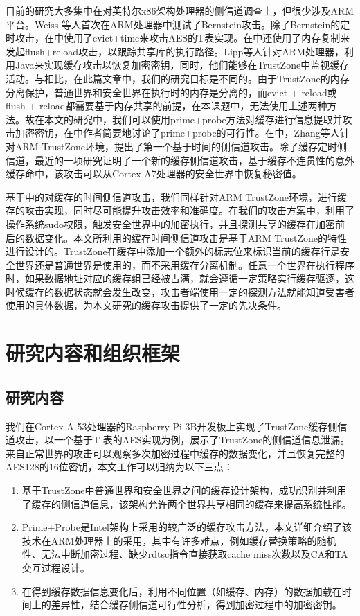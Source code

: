 目前的研究大多集中在对英特尔x86架构处理器的侧信道调查上，但很少涉及ARM平台。Weiss 等人\cite{weiss2012cache}首次在ARM处理器中测试了Bernstein攻击。除了Bernstein的定时攻击，在\cite{lipp2016armageddon}中使用了evict+time来攻击AES的T表实现。在\cite{zhang2016return}中还使用了内存复制来发起flush+reload攻击，以跟踪共享库的执行路径。Lipp等人\cite{lipp2016armageddon}针对ARM处理器，利用Java来实现缓存攻击以恢复加密密钥，同时，他们能够在TrustZone中监视缓存活动。与\cite{lipp2016armageddon,zhang2016return}相比，在此篇文章中，我们的研究目标是不同的。由于TrustZone的内存分离保护，普通世界和安全世界在执行时的内存是分离的，而evict + reload\cite{lipp2016armageddon}或flush + reload\cite{zhang2016return}都需要基于内存共享的前提，在本课题中，无法使用上述两种方法。故在本文的研究中，我们可以使用prime+probe方法对缓存进行信息提取并攻击加密密钥，在\cite{lipp2016armageddon}中作者简要地讨论了prime+probe的可行性。在\cite{zhang2016truspy}中，Zhang等人针对ARM TrustZone环境，提出了第一个基于时间的侧信道攻击。除了缓存定时侧信道，最近的一项研究证明了一个新的缓存侧信道攻击，基于缓存不连贯性的意外缓存命中\cite{guanciale2016cache}，该攻击可以从Cortex-A7处理器的安全世界中恢复秘密值。

基于\cite{zhang2016truspy}中的对缓存的时间侧信道攻击，我们同样针对ARM TrustZone环境，进行缓存的攻击实现，同时尽可能提升攻击效率和准确度。在我们的攻击方案中，利用了操作系统sudo权限，触发安全世界中的加密执行，并且探测共享的缓存在加密前后的数据变化。本文所利用的缓存时间侧信道攻击是基于ARM TrustZone的特性进行设计的。TrustZone在缓存中添加一个额外的标志位来标识当前的缓存行是安全世界还是普通世界是使用的，而不采用缓存分离机制。任意一个世界在执行程序时，如果数据地址对应的缓存组已经被占满，就会遵循一定策略实行缓存驱逐，这时候缓存的数据状态就会发生改变，攻击者端使用一定的探测方法就能知道受害者使用的具体数据，为本文研究的缓存攻击提供了一定的先决条件。
\section{研究内容和组织框架}
\subsection{研究内容}
我们在Cortex A-53处理器的Raspberry Pi 3B开发板上实现了TrustZone缓存侧信道攻击，以一个基于T-表的AES实现为例，展示了TrustZone的侧信道信息泄漏。来自正常世界的攻击可以观察多次加密过程中缓存的数据变化，并且恢复完整的AES128的16位密钥，本文工作可以归纳为以下三点：
\begin{enumerate}[label=(\arabic*)]
	\item 基于TrustZone中普通世界和安全世界之间的缓存设计架构，成功识别并利用了缓存的侧信道信息，该架构允许两个世界共享相同的缓存来提高系统性能。
	\item Prime+Probe是Intel架构上采用的较广泛的缓存攻击方法，本文详细介绍了该技术在ARM处理器上的采用，其中有许多难点，例如缓存替换策略的随机性、无法中断加密过程、缺少rdtsc指令直接获取cache miss次数以及CA和TA交互过程设计。
	\item 在得到缓存数据信息变化后，利用不同位置（如缓存、内存）的数据加载在时间上的差异性，结合缓存侧信道可行性分析，得到加密过程中的加密密钥。 
\end{enumerate}
